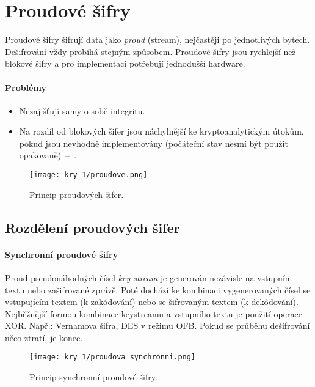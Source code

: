 
\section{Proudové šifry}

Proudové šifry šifrují data jako \textit{proud} (stream), nejčastěji po jednotlivých bytech. Dešifrování vždy probíhá stejným způsobem. Proudové šifry jsou rychlejší než blokové šifry a pro implementaci potřebují jednodušší hardware.

\paragraph*{Problémy} \begin{itemize}
    \item Nezajišťují samy o sobě integritu.
    \item Na rozdíl od blokových šifer jsou náchylnější ke kryptoanalytickým útokům, pokud jsou nevhodně implementovány (počáteční stav nesmí být použit opakovaně)~--~.
\end{itemize}

\begin{figure}[H]
    \centering
    \texttt{[image: kry\_1/proudove.png]}
    \caption{Princip proudových šifer.}
\end{figure}

\subsection*{Rozdělení proudových šifer}

\paragraph*{Synchronní proudové šifry} Proud pseudonáhodných čísel \textit{key stream} je generován nezávisle na vstupním textu nebo zašifrované zprávě. Poté dochází ke kombinaci vygenerovaných čísel se vstupujícím textem (k zakódování) nebo se šifrovaným textem (k dekódování). Nejběžnější formou kombinace keystreamu a vstupního textu je použití operace XOR. Např.: Vernamova šifra, DES v režimu OFB. Pokud se průběhu dešifrování něco ztratí, je konec.

\begin{figure}[H]
    \centering
    \texttt{[image: kry\_1/proudova\_synchronni.png]}
    \caption{Princip synchronní proudové šifry.}
\end{figure}

